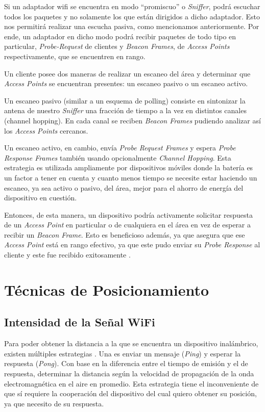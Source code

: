 Si un adaptador \acs{wifi} se encuentra en modo “promiscuo” o \emph{Sniffer}, podrá escuchar todos los paquetes y no solamente los que están dirigidos a dicho adaptador. Esto nos permitirá realizar una escucha pasiva, como mencionamos anteriormente. Por ende, un adaptador en dicho modo podrá recibir paquetes de todo tipo en particular, \emph{Probe-Request} de clientes y \emph{Beacon Frames}, de \emph{Access Points} respectivamente, que se encuentren en rango. 

Un cliente posee dos maneras de realizar un escaneo del área y determinar que \emph{Access Points} se encuentran presentes: un escaneo pasivo o un escaneo activo. 

Un escaneo pasivo (similar a un esquema de polling) consiste en sintonizar la antena de nuestro \emph{Sniffer} una fracción de tiempo a la vez en distintos canales (channel hopping). En cada canal se reciben \emph{Beacon Frames} pudiendo analizar así los \emph{Access Points} cercanos. 

Un escaneo activo, en cambio, envía \emph{Probe Request Frames} y espera \emph{Probe Response Frames} también usando opcionalmente \emph{Channel Hopping}. Esta estrategia es utilizada ampliamente por dispositivos móviles donde la batería es un factor a tener en cuenta y cuanto menos tiempo se necesite estar haciendo un escaneo, ya sea activo o pasivo, del área, mejor para el ahorro de energía del dispositivo en cuestión.

Entonces, de esta manera, un dispositivo podría activamente solicitar respuesta de un \emph{Access Point} en particular o de cualquiera en el área en vez de esperar a recibir un \emph{Beacon Frame}. Esto es beneficioso además, ya que asegura que ese \emph{Access Point} está en rango efectivo, ya que este pudo enviar su \emph{Probe Response} al cliente y este fue recibido exitosamente \cite{IEEE80211-2016}\cite{tanenbaum2011computer}.

\section{Técnicas de Posicionamiento}
\subsection{Intensidad de la Señal WiFi}

Para poder obtener la distancia a la que se encuentra un dispositivo inalámbrico, existen múltiples estrategias \cite{8692423} \cite{10.1007/1-4020-8155-3_8}. Una es enviar un mensaje (\emph{Ping}) y esperar la respuesta (\emph{Pong}). Con base en la diferencia entre el tiempo de emisión y el de respuesta, determinar la distancia según la velocidad de propagación de la onda electromagnética en el aire en promedio. Esta estrategia tiene el inconveniente de que sí requiere la cooperación del dispositivo del cual quiero obtener su posición, ya que necesito de su respuesta.

